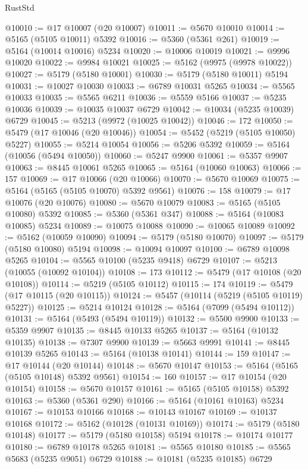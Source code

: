 \begin{lexlean}{RustStd}
\begin{coremodule}
@10010 := @17 @10007 (@20 @10007)
@10011 := @5670 @10010
@10014 := @5165 (@5105 @10011) @5392
@10016 := @5360 (@5361 @261)
@10019 := @5164 (@10014 @10016) @5234
@10020 := @10006 @10019
@10021 := @9996 @10020
@10022 := @9984 @10021
@10025 := @5162 (@9975 (@9978 @10022))
@10027 := @5179 (@5180 @10001)
@10030 := @5179 (@5180 @10011) @5194
@10031 := @10027 @10030
@10033 := @6789 @10031 @5265
@10034 := @5565 @10033
@10035 := @5565 @6211
@10036 := @5559 @5166
@10037 := @5235 @10036
@10039 := @10035 @10037 @6729
@10042 := @10034 (@5235 @10039) @6729
@10045 := @5213 (@9972 (@10025 @10042))
@10046 := 172
@10050 := @5479 (@17 @10046 (@20 @10046))
@10054 := @5452 (@5219 (@5105 @10050) @5227)
@10055 := @5214 @10054
@10056 := @5206 @5392
@10059 := @5164 (@10056 (@5494 @10050))
@10060 := @5247 @9900
@10061 := @5357 @9907
@10063 := @8445 @10061 @5265
@10065 := @5164 (@10060 @10063)
@10066 := 157
@10069 := @17 @10066 (@20 @10066)
@10070 := @5670 @10069
@10075 := @5164 (@5165 (@5105 @10070) @5392 @9561)
@10076 := 158
@10079 := @17 @10076 (@20 @10076)
@10080 := @5670 @10079
@10083 := @5165 (@5105 @10080) @5392
@10085 := @5360 (@5361 @347)
@10088 := @5164 (@10083 @10085) @5234
@10089 := @10075 @10088
@10090 := @10065 @10089
@10092 := @5162 (@10059 @10090)
@10094 := @5179 (@5180 @10070)
@10097 := @5179 (@5180 @10080) @5194
@10098 := @10094 @10097
@10100 := @6789 @10098 @5265
@10104 := @5565 @10100 (@5235 @9418) @6729
@10107 := @5213 (@10055 (@10092 @10104))
@10108 := 173
@10112 := @5479 (@17 @10108 (@20 @10108))
@10114 := @5219 (@5105 @10112)
@10115 := 174
@10119 := @5479 (@17 @10115 (@20 @10115))
@10124 := @5457 (@10114 (@5219 (@5105 @10119) @5227))
@10125 := @5214 @10124
@10128 := @5164 (@7099 (@5494 @10112))
@10131 := @5164 (@5493 (@5494 @10119))
@10132 := @5500 @9900
@10133 := @5359 @9907
@10135 := @8445 @10133 @5265
@10137 := @5164 (@10132 @10135)
@10138 := @7307 @9900
@10139 := @5663 @9991
@10141 := @8445 @10139 @5265
@10143 := @5164 (@10138 @10141)
@10144 := 159
@10147 := @17 @10144 (@20 @10144)
@10148 := @5670 @10147
@10153 := @5164 (@5165 (@5105 @10148) @5392 @9561)
@10154 := 160
@10157 := @17 @10154 (@20 @10154)
@10158 := @5670 @10157
@10161 := @5165 (@5105 @10158) @5392
@10163 := @5360 (@5361 @290)
@10166 := @5164 (@10161 @10163) @5234
@10167 := @10153 @10166
@10168 := @10143 @10167
@10169 := @10137 @10168
@10172 := @5162 (@10128 (@10131 @10169))
@10174 := @5179 (@5180 @10148)
@10177 := @5179 (@5180 @10158) @5194
@10178 := @10174 @10177
@10180 := @6789 @10178 @5265
@10181 := @5565 @10180
@10185 := @5565 @5683 (@5235 @9051) @6729
@10188 := @10181 (@5235 @10185) @6729

\end{coremodule}
\end{lexlean}
